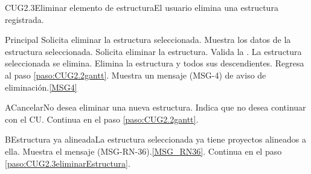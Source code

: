 	\begin{UseCase}{CUG2.3}{Eliminar elemento de estructura}{El usuario elimina una estructura registrada.}
	\end{UseCase}

	\begin{UCtrayectoria}{Principal}
		\UCpaso[\UCactor] Solicita eliminar la estructura seleccionada.
		\UCpaso Muestra los datos de la estructura seleccionada. \label{paso:CUG2.3eliminarEstructura}
		\UCpaso [\UCactor] Solicita eliminar la estructura. 
		\UCpaso Valida la . 
		\UCpaso La estructura seleccionada se elimina.
		\UCpaso Elimina la estructura y todos sus descendientes.
		\UCpaso Regresa al paso \ref{paso:CUG2.2gantt}.
		\UCpaso Muestra un mensaje (MSG-4) de aviso de eliminación.\ref{MSG4}
	\end{UCtrayectoria}

	\begin{UCtrayectoriaA}{A}{Cancelar}{No desea eliminar una nueva estructura.}
		\UCpaso[\UCactor] Indica que no desea continuar con el CU.
		\UCpaso Continua en el paso \ref{paso:CUG2.2gantt}.
	\end{UCtrayectoriaA}

	\begin{UCtrayectoriaA}{B}{Estructura ya alineada}{La estructura seleccionada ya tiene proyectos alineados a ella.}
		\UCpaso Muestra el mensaje (MSG-RN-36).\ref{MSG_RN36}.
		\UCpaso Continua en el paso \ref{paso:CUG2.3eliminarEstructura}.
	\end{UCtrayectoriaA}